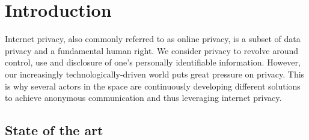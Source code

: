 
\begin{abstract}

\end{abstract}
\section{Introduction}
Internet privacy, also commonly referred to as online privacy, is a subset of data privacy and a fundamental human right. We consider privacy to revolve around control, use and disclosure of one’s personally identifiable information.
However, our increasingly technologically-driven world puts great pressure on privacy. 
This is why several actors in the space are continuously developing different solutions to achieve anonymous communication and thus leveraging internet privacy.


\subsection{State of the art}

